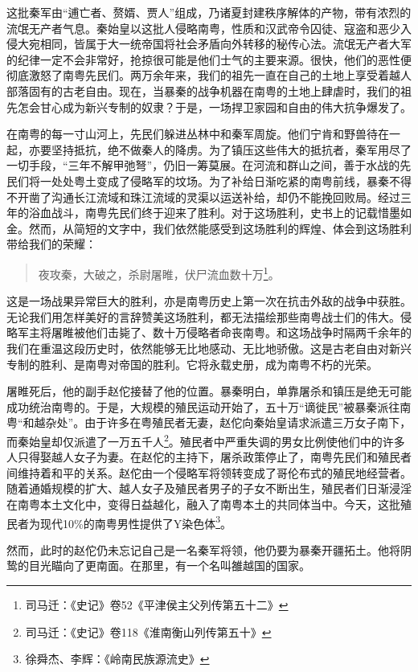 这批秦军由“逋亡者、赘婿、贾人”组成，乃诸夏封建秩序解体的产物，带有浓烈的流氓无产者气息。秦始皇以这批人侵略南粤，性质和汉武帝令囚徒、寇盗和恶少入侵大宛相同，皆属于大一统帝国将社会矛盾向外转移的秘传心法。流氓无产者大军的纪律一定不会非常好，抢掠很可能是他们士气的主要来源。很快，他们的恶性便彻底激怒了南粤先民们。两万余年来，我们的祖先一直在自己的土地上享受着越人部落固有的古老自由。现在，当暴秦的战争机器在南粤的土地上肆虐时，我们的祖先怎会甘心成为新兴专制的奴隶？于是，一场捍卫家园和自由的伟大抗争爆发了。

在南粤的每一寸山河上，先民们躲进丛林中和秦军周旋。他们宁肯和野兽待在一起，亦要坚持抵抗，绝不做秦人的降虏。为了镇压这些伟大的抵抗者，秦军用尽了一切手段，“三年不解甲弛弩”，仍旧一筹莫展。在河流和群山之间，善于水战的先民们将一处处粤土变成了侵略军的坟场。为了补给日渐吃紧的南粤前线，暴秦不得不开凿了沟通长江流域和珠江流域的灵渠以运送补给，却仍不能挽回败局。经过三年的浴血战斗，南粤先民们终于迎来了胜利。对于这场胜利，史书上的记载惜墨如金。然而，从简短的文字中，我们依然能感受到这场胜利的辉煌、体会到这场胜利带给我们的荣耀：

\begin{quote}
	夜攻秦，大破之，杀尉屠睢，伏尸流血数十万\footnote{司马迁：《史记》卷52《平津侯主父列传第五十二》}。
\end{quote}

\indent 这是一场战果异常巨大的胜利，亦是南粤历史上第一次在抗击外敌的战争中获胜。无论我们用怎样美好的言辞赞美这场胜利，都无法描绘那些南粤战士们的伟大。侵略军主将屠睢被他们击毙了、数十万侵略者命丧南粤。和这场战争时隔两千余年的我们在重温这段历史时，依然能够无比地感动、无比地骄傲。这是古老自由对新兴专制的胜利、是南粤对帝国的胜利。它将永载史册，成为南粤不朽的光荣。

屠睢死后，他的副手赵佗接替了他的位置。暴秦明白，单靠屠杀和镇压是绝无可能成功统治南粤的。于是，大规模的殖民运动开始了，五十万“谪徙民”被暴秦派往南粤“和越杂处”。由于许多在粤殖民者无妻，赵佗向秦始皇请求派遣三万女子南下，而秦始皇却仅派遣了一万五千人\footnote{司马迁：《史记》卷118《淮南衡山列传第五十》}。殖民者中严重失调的男女比例使他们中的许多人只得娶越人女子为妻。在赵佗的主持下，屠杀政策停止了，南粤先民们和殖民者间维持着和平的关系。赵佗由一个侵略军将领转变成了哥伦布式的殖民地经营者。随着通婚规模的扩大、越人女子及殖民者男子的子女不断出生，殖民者们日渐浸淫在南粤本土文化中，变得日益越化，融入了南粤本土的共同体当中。今天，这批殖民者为现代10\%的南粤男性提供了Y染色体\footnote{徐舜杰、李辉：《岭南民族源流史》}。

然而，此时的赵佗仍未忘记自己是一名秦军将领，他仍要为暴秦开疆拓土。他将阴鸷的目光瞄向了更南面。在那里，有一个名叫雒越国的国家。

